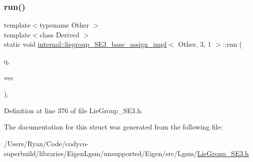 \subsubsection{\texorpdfstring{run()}{run()}}
{\footnotesize\ttfamily template$<$typename Other $>$ \\
template$<$class Derived $>$ \\
static void \hyperlink{structinternal_1_1liegroup___s_e3__base__assign__impl}{internal\+::liegroup\+\_\+\+S\+E3\+\_\+base\+\_\+assign\+\_\+impl}$<$ Other, 3, 1 $>$\+::run (\begin{DoxyParamCaption}\item[{\hyperlink{class_lie_group_base}{Lie\+Group\+Base}$<$ Array$<$ typename internal\+::traits$<$ Derived $>$\+::\hyperlink{structinternal_1_1liegroup___s_e3__base__assign__impl_3_01_other_00_013_00_011_01_4_aef78132c5f1f66237af2dcf4873a24d0}{Scalar}, 7, 1 $>$, Derived $>$ \&}]{q,  }\item[{const Other \&}]{vec }\end{DoxyParamCaption})\hspace{0.3cm}{\ttfamily [inline]}, {\ttfamily [static]}}



Definition at line 376 of file Lie\+Group\+\_\+\+S\+E3.\+h.



The documentation for this struct was generated from the following file\+:\begin{DoxyCompactItemize}
\item 
/\+Users/\+Ryan/\+Code/codyco-\/superbuild/libraries/\+Eigen\+Lgsm/unsupported/\+Eigen/src/\+Lgsm/\hyperlink{_lie_group___s_e3_8h}{Lie\+Group\+\_\+\+S\+E3.\+h}\end{DoxyCompactItemize}
